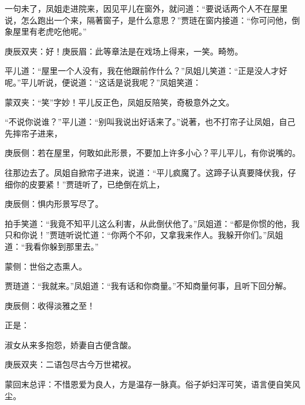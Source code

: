 \begin{parag}
    一句未了，凤姐走进院来，因见平儿在窗外，就问道：“要说话两个人不在屋里说，怎么跑出一个来，隔著窗子，是什么意思？”贾琏在窗内接道：“你可问他，倒象屋里有老虎吃他呢。”\begin{note}庚辰双夹：好！庚辰眉：此等章法是在戏场上得来，一笑。畸笏。\end{note}平儿道：“屋里一个人没有，我在他跟前作什么？”凤姐儿笑道：“正是没人才好呢。”平儿听说，便说道：“这话是说我呢？”凤姐笑道：\begin{note}蒙双夹：“笑”字妙！平儿反正色，凤姐反陪笑，奇极意外之文。\end{note}“不说你说谁？”平儿道：“别叫我说出好话来了。”说著，也不打帘子让凤姐，自己先摔帘子进来，\begin{note}庚辰侧：若在屋里，何敢如此形景，不要加上许多小心？平儿平儿，有你说嘴的。\end{note}往那边去了。凤姐自掀帘子进来，说道：“平儿疯魔了。这蹄子认真要降伏我，仔细你的皮要紧！”贾琏听了，已绝倒在炕上，\begin{note}庚辰侧：惧内形景写尽了。\end{note}拍手笑道：“我竟不知平儿这么利害，从此倒伏他了。”凤姐道：“都是你惯的他，我只和你说！”贾琏听说忙道：“你两个不卯，又拿我来作人。我躲开你们。”凤姐道：“我看你躲到那里去。”\begin{note}蒙侧：世俗之态熏人。\end{note}贾琏道：“我就来。”凤姐道：“我有话和你商量。”不知商量何事，且听下回分解。\begin{note}庚辰侧：收得淡雅之至！\end{note}正是：
\end{parag}


\begin{poem}
    \begin{pl}淑女从来多抱怨，娇妻自古便含酸。\end{pl}
    \begin{note}庚辰双夹：二语包尽古今万世裙衩。\end{note}
\end{poem}


\begin{parag}
    \begin{note}蒙回末总评：不惜恩爱为良人，方是温存一脉真。俗子妒妇浑可笑，语言便自笑风尘。\end{note}
\end{parag}
